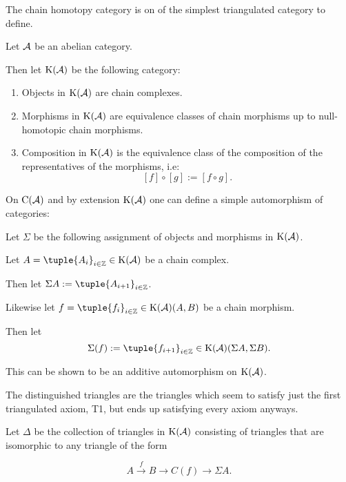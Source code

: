 The chain homotopy category is on of the simplest triangulated category to define.

\begin{definition}
    \label{def:chain_homotopy_cat}
    Let \( {\mathcal{A}} \) be an abelian category.

    Then let \( \operatorname{K}({\mathcal{A}}) \) be the following category:
    \begin{enumerate}
        \item {
            Objects in \( \operatorname{K}({\mathcal{A}}) \) are chain complexes.
        }
        \item {
            Morphisms in \( \operatorname{K}({\mathcal{A}}) \) are equivalence classes of chain morphisms up to null-homotopic chain morphisms.
        }
        \item {
            Composition in \( \operatorname{K}({\mathcal{A}}) \) is the equivalence class of the composition of the representatives of the morphisms, i.e:
            \[
                [f] \circ [g] := [f \circ g].
            \]
        }
    \end{enumerate}
\end{definition}

On \( \operatorname{C}({\mathcal{A}}) \) and by extension \( \operatorname{K}({\mathcal{A}}) \) one can define a simple automorphism of categories:

\begin{definition}
    \label{def:chain_homotopy_shift}
    Let \( \Sigma \) be the following assignment of objects and morphisms in \( \operatorname{K}({\mathcal{A}}) \).

    Let \( A = \tuple{A_i}_{i \in \Zb} \in \K(\Ac) \) be a chain complex.

    Then let \( \Sigma A := \tuple{A_{i + 1}}_{i \in \Zb} \).

    Likewise let \( f = \tuple{f_i}_{i \in \Zb} \in \K(\Ac)(A, B) \) be a chain morphism.

    Then let
    \[
        \Sigma(f) := \tuple{f_{i + 1}}_{i \in \Zb} \in \K(\Ac)(\Sigma A, \Sigma B).
    \]

    This can be shown to be an additive automorphism on \( \operatorname{K}({\mathcal{A}}) \).
\end{definition}

The distinguished triangles are the triangles which seem to satisfy just the first triangulated axiom, T1, but ends up satisfying every axiom anyways.

\begin{definition}
    \label{def:chain_homotopy_dist}
    Let \( \Delta \) be the collection of triangles in \( \operatorname{K}({\mathcal{A}}) \) consisting of triangles that are isomorphic to any triangle of the form

    \[
        A \stackrel{f}{\to} B \to C(f) \to \Sigma A.
    \]
\end{definition}

